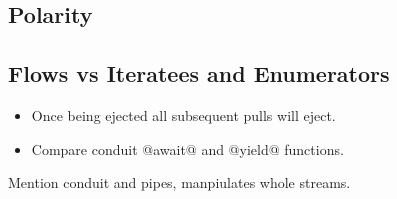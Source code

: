 \subsection{Polarity}


\subsection{Flows vs Iteratees and Enumerators}

\begin{itemize}
\item Once being ejected all subsequent pulls will eject.
\item Compare conduit @await@ and @yield@ functions.
\end{itemize}

Mention conduit and pipes, manpiulates whole streams.



